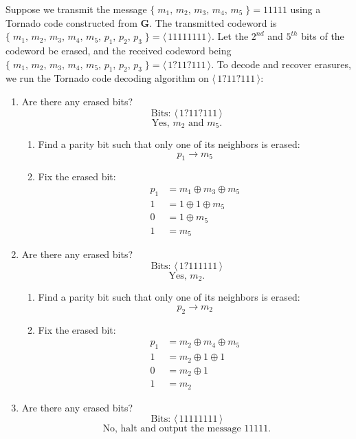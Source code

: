 \documentclass{AssignmentCUNY}
\newcommand{\CodeWord}[1]{\ensuremath{\langle\,#1\,\rangle}}
\begin{document}
%

Suppose we transmit the message $\{\;m_1,\, m_2,\, m_3,\, m_4,\, m_5\;\} = 11111$ using a Tornado code constructed from $\mathbf{G}$.
The transmitted codeword is $\{\;m_1,\, m_2,\, m_3,\, m_4,\, m_5,\, p_1,\, p_2,\, p_3 \;\} = \CodeWord{11111111}$.
Let the $2^{nd}$ and $5^{th}$ bits of the codeword be erased, and the received codeword being$ \{\;m_1,\, m_2,\, m_3,\, m_4,\, m_5,\, p_1,\, p_2,\, p_3 \;\} = \CodeWord{1?11?111}$. To decode and recover erasures, we run the Tornado code decoding algorithm on $\CodeWord{1?11?111}$:

\begin{enumerate}[label=\textbf{\emph{Round} \arabic*:}, leftmargin=*]

\item Are there any erased bits?
\[\text{Bits: } \CodeWord{1?11?111} \]
\[\text{Yes, } m_2 \text{ and } m_5 \text{.}\]

\begin{enumerate}[label=\textbf{\emph{Step} \arabic*:}]
	
\item Find a parity bit such that only one of its neighbors is erased:
\[p_1 \to m_5\]

\item Fix the erased bit:
\begin{align*}
p_1 &= m_1 \oplus m_3 \oplus m_5 \\
  1 &=     1 \oplus 1 \oplus m_5 \\
  0 &=              1 \oplus m_5 \\
  1 &= m_5
\end{align*}

\end{enumerate}

\item Are there any erased bits?
\[\text{Bits: } \CodeWord{1?111111} \]
\[\text{Yes, } m_2 \text{.}\]

\begin{enumerate}[label=\textbf{\emph{Step} \arabic*:}]

\item Find a parity bit such that only one of its neighbors is erased:
\[p_2 \to m_2\]

\item Fix the erased bit:
\begin{align*}
p_1 &= m_2 \oplus m_4 \oplus m_5 \\
  1 &= m_2 \oplus 1 \oplus 1 \\
  0 &= m_2 \oplus 1 \\
  1 &= m_2
\end{align*}

\end{enumerate}

\item Are there any erased bits?
\[\text{Bits: } \CodeWord{11111111} \]
\[\text{No, halt and output the message } 11111\text{.}\]

\end{enumerate}
\end{document}
